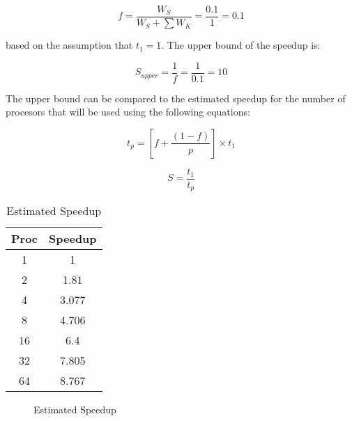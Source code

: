 \documentclass{article}
\begin{document}
  \[ f = \frac{W_S}{W_S + \sum W_K} = \frac{0.1}{1} = 0.1 \]

  based on the assumption that \( t_1 = 1 \). The upper bound of the speedup 
  is:

  \[ S_{upper} = \frac{1}{f} = \frac{1}{0.1} = 10 \]

  The upper bound can be compared to the estimated speedup for the number of
  procesors that will be used using the following equations:

  \[ t_p = \left[ f + \frac{\left( 1 - f \right)}{p} \right] \times t_1 \]

  \[ S = \frac{t_1}{t_p} \]

  \begin{table}[H]
    \centering

    \begin{tabular}{|c|c|}
      \hline
      Proc & Speedup \\
      \hline
      1  & 1                  \\
      2  & 1.$\overline{81}$  \\
      4  & 3.077              \\
      8  & 4.706              \\
      16 & 6.4                \\
      32 & 7.805              \\
      64 & 8.767              \\
      \hline
    \end{tabular}
    \caption{Estimated Speedup}
    \label{tab:estspeeduptab}
  \end{table}

  \begin{figure}[H]
    \centering

    \caption{Estimated Speedup}
    \label{fig:estspeedupfig}
  \end{figure}
\end{document}
